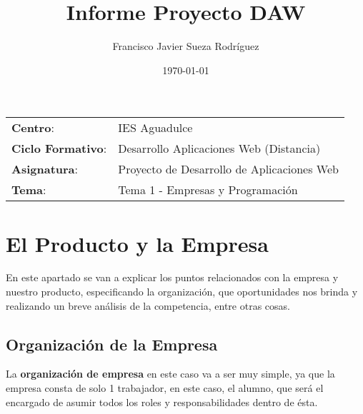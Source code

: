 


\title{
\vspace{10ex}
\normalfont \normalsize
\huge \textbf{Informe Proyecto DAW}
}
\author{Francisco Javier Sueza Rodríguez}
\date{\normalsize\today}




\maketitle

\thispagestyle{empty}

\vspace{65ex}

\begin{center}
    \begin{tabular}{l l}
        \textbf{Centro}: & IES Aguadulce \\
        \textbf{Ciclo Formativo}: & Desarrollo Aplicaciones Web (Distancia)\\
        \textbf{Asignatura}: & Proyecto de Desarrollo de Aplicaciones Web\\
        \textbf{Tema}: & Tema 1 - Empresas y Programación\\
    \end{tabular}
\end{center}

\newpage

\tableofcontents

\newpage

\section{El Producto y la Empresa}
En este apartado se van a explicar los puntos relacionados con la empresa y nuestro producto, especificando la organización, que oportunidades nos brinda y realizando un breve análisis de la competencia, entre otras cosas.

\subsection{Organización de la Empresa}
La \textbf{organización de empresa} en este caso va a ser muy simple, ya que la empresa consta de solo 1 trabajador, en este caso, el alumno, que será el encargado de asumir todos los roles y responsabilidades dentro de ésta.


